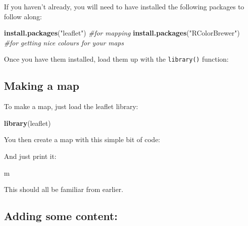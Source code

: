\documentclass[]{book}
\newenvironment{Shaded}{\begin{snugshade}}{\end{snugshade}}
\newcommand{\CommentTok}[1]{\textcolor[rgb]{0.56,0.35,0.01}{\textit{#1}}}
\newcommand{\KeywordTok}[1]{\textcolor[rgb]{0.13,0.29,0.53}{\textbf{#1}}}
\newcommand{\NormalTok}[1]{#1}
\newcommand{\OperatorTok}[1]{\textcolor[rgb]{0.81,0.36,0.00}{\textbf{#1}}}
\newcommand{\StringTok}[1]{\textcolor[rgb]{0.31,0.60,0.02}{#1}}
\begin{document}
If you haven't already, you will need to have installed the following packages to follow along:

\begin{Shaded}
\begin{Highlighting}[]
\KeywordTok{install.packages}\NormalTok{(}\StringTok{"leaflet"}\NormalTok{) }\CommentTok{#for mapping}
\KeywordTok{install.packages}\NormalTok{(}\StringTok{"RColorBrewer"}\NormalTok{) }\CommentTok{#for getting nice colours for your maps}
\end{Highlighting}
\end{Shaded}

Once you have them installed, load them up with the \texttt{library()} function:

\hypertarget{making-a-map}{%
\subsection{Making a map}\label{making-a-map}}

To make a map, just load the leaflet library:

\begin{Shaded}
\begin{Highlighting}[]
\KeywordTok{library}\NormalTok{(leaflet)}
\end{Highlighting}
\end{Shaded}

You then create a map with this simple bit of code:

\begin{Shaded}
\end{Shaded}

And just print it:

\begin{Shaded}
\begin{Highlighting}[]
\NormalTok{m  }
\end{Highlighting}
\end{Shaded}

\hypertarget{htmlwidget-12a2a8bf6ed87930e401}{}

This should all be familiar from earlier.

\hypertarget{adding-some-content}{%
\subsection{Adding some content:}\label{adding-some-content}}
\end{document}
